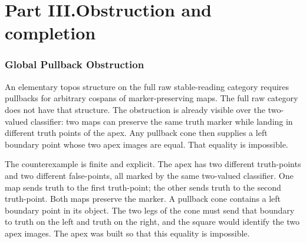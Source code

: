 \documentclass[11pt]{article}
\begin{document}
\part*{Part III.\quad Obstruction and completion}

\section{Global Pullback Obstruction}

An elementary topos structure on the full raw stable-reading category
requires pullbacks for arbitrary cospans of marker-preserving maps.  The
full raw category does not have that structure.  The obstruction is
already visible over the two-valued classifier: two maps can preserve the
same truth marker while landing in different truth points of the apex.
Any pullback cone then supplies a left boundary point whose two apex
images are equal.  That equality is impossible.

The counterexample is finite and explicit.  The apex has two different
truth-points and two different false-points, all marked by the same two-valued
classifier.  One map sends truth to the first truth-point; the other
sends truth to the second truth-point.  Both maps preserve the marker.
A pullback cone contains a left boundary point in its object.  The two
legs of the cone must send that boundary to truth on the left and truth
on the right, and the square would identify the two apex images.  The
apex was built so that this equality is impossible.

\begin{center}
\end{center}
\end{document}
